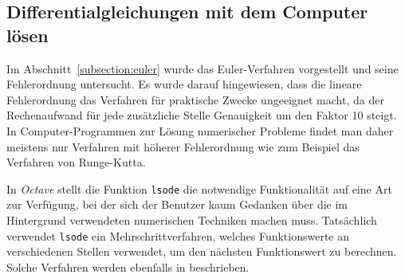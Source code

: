 %
%
%
\subsection{Differentialgleichungen mit dem Computer lösen\label{section:octave}}
Im Abschnitt~\ref{subsection:euler} wurde das Euler-Verfahren
vorgestellt und seine Fehlerordnung untersucht.
Es wurde darauf hingewiesen, dass die lineare Fehlerordnung das Verfahren
für praktische Zwecke ungeeignet macht, da der Rechenaufwand für jede
zusätzliche Stelle Genauigkeit um den Faktor 10 steigt.
In Computer-Programmen zur Lösung numerischer Probleme findet man daher
meistens nur Verfahren mit höherer Fehlerordnung wie zum Beispiel
das Verfahren von Runge-Kutta.

In {\em Octave} stellt die Funktion \texttt{lsode} die notwendige
%
Funktionalität auf eine Art zur Verfügung, bei der sich der
Benutzer kaum Gedanken über die im Hintergrund verwendeten
numerischen Techniken machen muss.
Tatsächlich verwendet \texttt{lsode} ein Mehrschrittverfahren, welches
Funktionswerte an verschiedenen Stellen verwendet, um den nächsten
Funktionswert zu berechnen.
Solche Verfahren werden ebenfalls in \cite{skript:mathsem-dgl} beschrieben.

